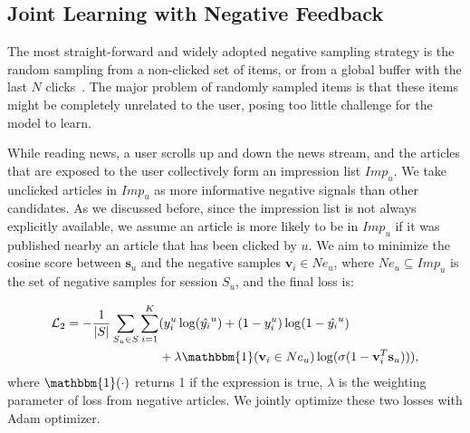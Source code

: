 \subsection{Joint Learning with Negative Feedback}
\label{sec:negative feedback}
The most straight-forward and widely adopted negative sampling strategy is the random sampling 
from a non-clicked set of items, or from a global buffer with the last $N$ 
clicks~\cite{moreira_news_2018}. 
The major problem of randomly sampled items is that these items might be completely unrelated to 
the user, posing too little challenge for the model to learn. 

While reading news, a user scrolls up and down the news stream, 
and the articles that are exposed to the user collectively 
form an impression list $Imp_u$. We take unclicked articles in $Imp_u$ as more informative negative signals than other candidates.
As we discussed before, since the impression list is not always explicitly available, 
we assume an article is more likely to be in $Imp_u$ if it was published nearby an article that has
been clicked by $u$.
We aim to minimize the cosine score between $\mathbf{s}_u$ and the negative samples 
$\mathbf{v}_i\in Ne_u$, where $Ne_u\subseteq Imp_u$ is the set of negative samples for session $S_u$, 
and the final loss is: 

\begin{equation}
    \label{eq:loss}
    \begin{split}
        \mathcal{L}_2 = - \frac{1}{|S|}\sum_{S_u \in S}\sum_{i=1}^K &( y_i^u \log(\hat{y_i}^u) + (1-y_i^u)\log(1-\hat{y_i}^u) \\
        & +  \lambda \mathbbm{1}(\mathbf{v}_i \in Ne_u) \log(\sigma(1-\mathbf{v}_i^T\mathbf{s}_u))),
    \end{split}
\end{equation}
where $\mathbbm{1}(\cdot)$ returns 1 if the expression is true, $\lambda$ is 
the weighting parameter of loss from negative articles. We jointly optimize these two losses 
with Adam optimizer. 
